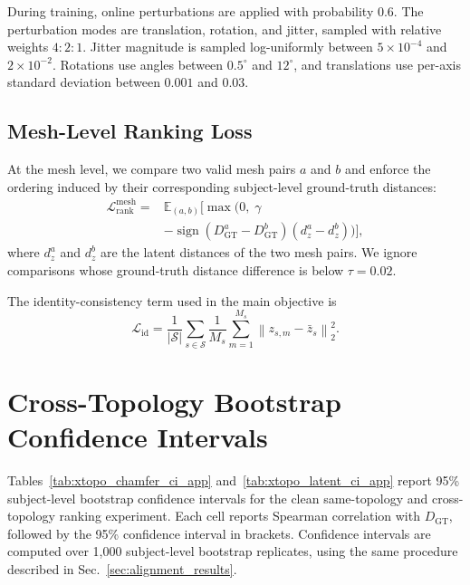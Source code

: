 \documentclass[10pt,twocolumn,letterpaper]{article}
\begin{document}
During training, online perturbations are applied with probability 0.6. The
perturbation modes are translation, rotation, and jitter, sampled with relative
weights $4{:}2{:}1$. Jitter magnitude is sampled log-uniformly between
$5\times10^{-4}$ and $2\times10^{-2}$. Rotations use angles between
$0.5^\circ$ and $12^\circ$, and translations use per-axis standard deviation
between $0.001$ and $0.03$.
\subsection{Mesh-Level Ranking Loss}
\label{app:mesh_level_ranking_loss}

At the mesh level, we compare two valid mesh pairs $a$ and $b$ and enforce the
ordering induced by their corresponding subject-level ground-truth distances:
\begin{equation}
\begin{split}
\mathcal L^{\mathrm{mesh}}_{\mathrm{rank}}
={}&
\mathbb E_{(a,b)}
\Big[
\max
\Big(
0,\;
\gamma
\\
&-
\operatorname{sign}
\left(
D_{\mathrm{GT}}^a-D_{\mathrm{GT}}^b
\right)
\left(
d_z^a-d_z^b
\right)
\Big)
\Big],
\end{split}
\end{equation}
where $d_z^a$ and $d_z^b$ are the latent distances of the two mesh pairs. We
ignore comparisons whose ground-truth distance difference is below $\tau=0.02$.

The identity-consistency term used in the main objective is
\begin{equation}
\mathcal L_{\mathrm{id}}
=
\frac{1}{|\mathcal S|}
\sum_{s\in\mathcal S}
\frac{1}{M_s}
\sum_{m=1}^{M_s}
\left\|
z_{s,m}-\bar z_s
\right\|_2^2 .
\end{equation}

\section{Cross-Topology Bootstrap Confidence Intervals}
\label{app:xtopo_bootstrap_ci}

Tables~\ref{tab:xtopo_chamfer_ci_app} and~\ref{tab:xtopo_latent_ci_app}
report 95\% subject-level bootstrap confidence intervals for the clean
same-topology and cross-topology ranking experiment. Each cell reports Spearman
correlation with $D_{\mathrm{GT}}$, followed by the 95\% confidence interval in
brackets. Confidence intervals are computed over 1,000 subject-level bootstrap
replicates, using the same procedure described in Sec.~\ref{sec:alignment_results}.
\end{document}
